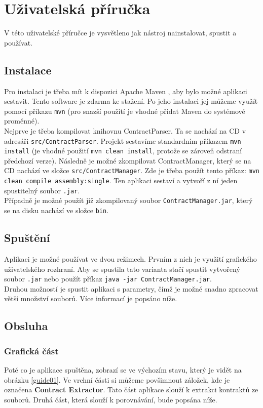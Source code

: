 \chapter{Uživatelská příručka}	
	V této uživatelské příručce je vysvětleno jak nástroj nainstalovat, spustit a používat.
	
	\section{Instalace}
		Pro instalaci je třeba mít k dispozici Apache Maven \cite{maven}, aby bylo možné aplikaci sestavit. Tento software je zdarma ke stažení. Po jeho instalaci jej můžeme využít pomocí příkazu \texttt{mvn} (pro snazší použití je vhodné přidat Maven do systémové proměnné).\\
		
		Nejprve je třeba kompilovat knihovnu ContractParser. Ta se nachází na CD v adresáři \texttt{src/ContractParser}. Projekt sestavíme standardním příkazem \texttt{mvn install} (je vhodné použití \texttt{mvn clean install}, protože se zároveň odstraní předchozí verze). Následně je možné zkompilovat ContractManager, který se na CD nachází ve složce \texttt{src/ContractManager}. Zde je třeba použít tento příkaz: \texttt{mvn clean compile assembly:single}. Ten aplikaci sestaví a vytvoří z ní jeden spustitelný soubor \texttt{.jar}.\\
		
		Případně je možné použít již zkompilovaný soubor \texttt{ContractManager.jar}, který se na disku nachází ve složce \texttt{bin}.
	
	\section{Spuštění}
		Aplikaci je možné používat ve dvou režimech. Prvním z nich je využití grafického uživatelského rozhraní. Aby se spustila tato varianta stačí spustit vytvořený soubor \texttt{.jar} nebo použít příkaz \texttt{java -jar ContractManager.jar}.\\
		
		Druhou možností je spustit aplikaci s parametry, čímž je možné snadno zpracovat větší množství souborů. Více informací je popsáno níže.
	
	\section{Obsluha}
	
		\subsection{Grafická část}
			Poté co je aplikace spuštěna, zobrazí se ve výchozím stavu, který je vidět na obrázku \ref{guide01}. Ve vrchní části si můžeme povšimnout záložek, kde je označena \textbf{Contract Extractor}. Tato část aplikace slouží k extrakci kontraktů ze souborů. Druhá část, která slouží k porovnávání, bude popsána níže.
			
